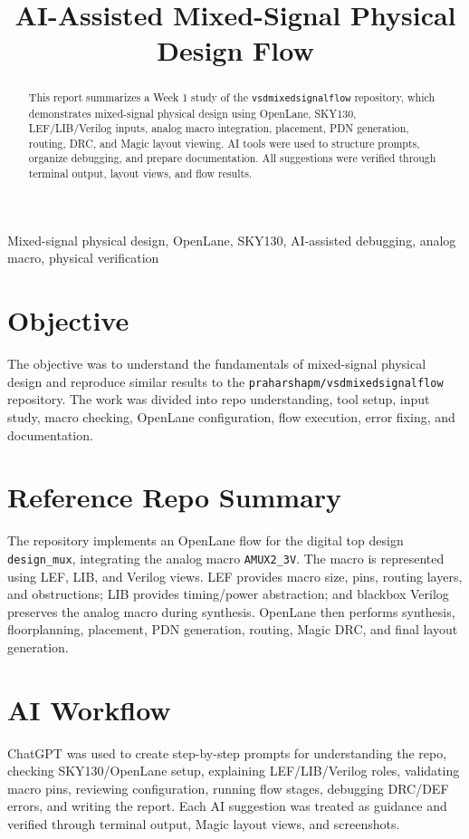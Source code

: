 \documentclass[10pt,conference]{IEEEtran}
\title{AI-Assisted Mixed-Signal Physical Design Flow}
\author{\IEEEauthorblockN{Shravani Bai K V}
\IEEEauthorblockA{Week 1 Task Report -- Mixed-Signal Physical Design}}
\date{}
\begin{document}
\maketitle

\begin{abstract}
This report summarizes a Week 1 study of the \texttt{vsdmixedsignalflow} repository, which demonstrates mixed-signal physical design using OpenLane, SKY130, LEF/LIB/Verilog inputs, analog macro integration, placement, PDN generation, routing, DRC, and Magic layout viewing. AI tools were used to structure prompts, organize debugging, and prepare documentation. All suggestions were verified through terminal output, layout views, and flow results.
\end{abstract}

\begin{IEEEkeywords}
Mixed-signal physical design, OpenLane, SKY130, AI-assisted debugging, analog macro, physical verification
\end{IEEEkeywords}

\section{Objective}
The objective was to understand the fundamentals of mixed-signal physical design and reproduce similar results to the \texttt{praharshapm/vsdmixedsignalflow} repository. The work was divided into repo understanding, tool setup, input study, macro checking, OpenLane configuration, flow execution, error fixing, and documentation.

\section{Reference Repo Summary}
The repository implements an OpenLane flow for the digital top design \texttt{design\_mux}, integrating the analog macro \texttt{AMUX2\_3V}. The macro is represented using LEF, LIB, and Verilog views. LEF provides macro size, pins, routing layers, and obstructions; LIB provides timing/power abstraction; and blackbox Verilog preserves the analog macro during synthesis. OpenLane then performs synthesis, floorplanning, placement, PDN generation, routing, Magic DRC, and final layout generation.

\section{AI Workflow}
ChatGPT was used to create step-by-step prompts for understanding the repo, checking SKY130/OpenLane setup, explaining LEF/LIB/Verilog roles, validating macro pins, reviewing configuration, running flow stages, debugging DRC/DEF errors, and writing the report. Each AI suggestion was treated as guidance and verified through terminal output, Magic layout views, and screenshots.
\end{document}
